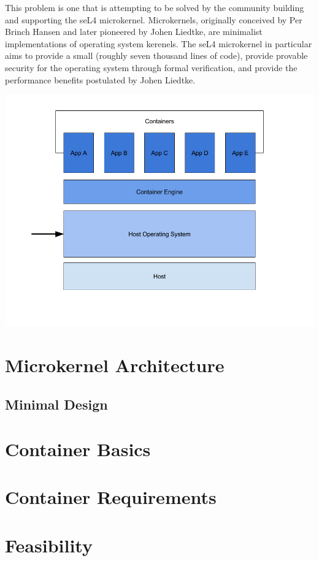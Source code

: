\documentclass[10pt]{article}
\begin{document}
	This problem is one that is attempting to be solved by the community building and supporting the seL4 microkernel.
	Microkernels, originally conceived by Per Brinch Hansen and later pioneered by Johen Liedtke, are minimalist
	implementations of operating system kerenels.\cite{microkernelperformance} The seL4 microkernel in particular aims
	to provide a small (roughly seven thousand lines of code), provide provable security for the operating system
	through formal verification, and provide the performance benefits postulated by Johen Liedtke.\cite{seL4FAQ}

	\includegraphics[scale=.4]{architecture}

\section*{Microkernel Architecture}
\subsection*{Minimal Design}

\section*{Container Basics}
\section*{Container Requirements}
\section*{Feasibility}



\end{document}
